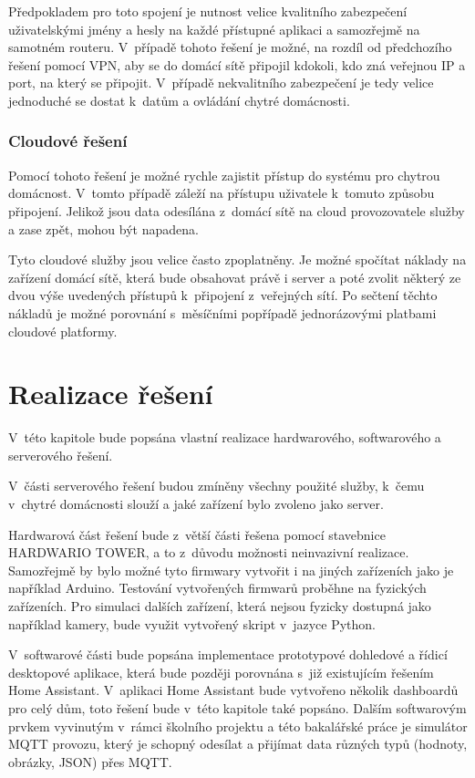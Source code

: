 Předpokladem pro toto spojení je nutnost velice kvalitního zabezpečení uživatelskými jmény a hesly na každé přístupné aplikaci a samozřejmě na samotném routeru. V~případě tohoto řešení je možné, na rozdíl od předchozího řešení pomocí VPN, aby se do domácí sítě připojil kdokoli, kdo zná veřejnou IP a port, na který se připojit. V~případě nekvalitního zabezpečení je tedy velice jednoduché se dostat k~datům a ovládání chytré domácnosti.

\subsection*{Cloudové řešení}
Pomocí tohoto řešení je možné rychle zajistit přístup do systému pro chytrou domácnost. V~tomto případě záleží na přístupu uživatele k~tomuto způsobu připojení. Jelikož jsou data odesílána z~domácí sítě na cloud provozovatele služby a zase zpět, mohou být napadena.

Tyto cloudové služby jsou velice často zpoplatněny. Je možné spočítat náklady na zařízení domácí sítě, která bude obsahovat právě i server a poté zvolit některý ze dvou výše uvedených přístupů k~připojení z~veřejných sítí. Po sečtení těchto nákladů je možné porovnání s~měsíčními popřípadě jednorázovými platbami cloudové platformy.


\chapter{Realizace řešení} \label{implementation}
V~této kapitole bude popsána vlastní realizace hardwarového, softwarového a serverového řešení.

V~části serverového řešení budou zmíněny všechny použité služby, k~čemu v~chytré domácnosti slouží a jaké zařízení bylo zvoleno jako server. 

Hardwarová část řešení bude z~větší části řešena pomocí stavebnice HARDWARIO TOWER, a to z~důvodu možnosti neinvazivní realizace. Samozřejmě by bylo možné tyto firmwary vytvořit i na jiných zařízeních jako je například Arduino. Testování vytvořených firmwarů proběhne na fyzických zařízeních. Pro simulaci dalších zařízení, která nejsou fyzicky dostupná jako například kamery, bude využit vytvořený skript v~jazyce Python.

V~softwarové části bude popsána implementace prototypové dohledové a řídicí desktopové aplikace, která bude později porovnána s~již existujícím řešením Home Assistant. V~aplikaci Home Assistant bude vytvořeno několik dashboardů pro celý dům, toto řešení bude v~této kapitole také popsáno.
Dalším softwarovým prvkem vyvinutým v~rámci školního projektu a této bakalářské práce je simulátor MQTT provozu, který je schopný odesílat a přijímat data různých typů (hodnoty, obrázky, JSON) přes MQTT. 


